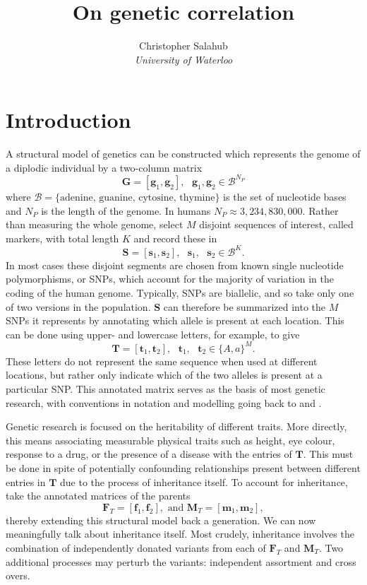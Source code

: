 \documentclass{article}
\title{On genetic correlation}
\author{Christopher Salahub \\
	\textit{University of Waterloo}}
\newcommand{\ve}[1]{\mathbf{#1}}           %
\newcommand{\m}[1]{\mathbf{#1}}               %
\begin{document}
	
\maketitle

\section{Introduction} \label{sec:intro}

A structural model of genetics can be constructed which represents the genome of a diplodic individual by a two-column matrix
$$\m{G} = [\ve{g}_1, \ve{g}_2], \text{ } \ve{g}_1, \ve{g}_2 \in \mathcal{B}^{N_P}$$
where $\mathcal{B} = \{\text{adenine, guanine, cytosine, thymine}\}$ is the set of nucleotide bases and $N_P$ is the length of the genome. In humans $N_P \approx 3,234,830,000$. Rather than measuring the whole genome, select $M$ disjoint sequences of interest, called markers, with total length $K$ and record these in
$$\m{S} = [\ve{s}_1 , \ve{s}_2], \text{ } \ve{s}_1, \text{ } \ve{s}_2 \in \mathcal{B}^K.$$
In most cases these disjoint segments are chosen from known single nucleotide polymorphisms, or SNPs, which account for the majority of variation in the coding of the human genome. Typically, SNPs are biallelic, and so take only one of two versions in the population. $\m{S}$ can therefore be summarized into the $M$ SNPs it represents by annotating which allele is present at each location. This can be done using upper- and lowercase letters, for example, to give
\begin{equation} \label{eq:annotMat}
  \m{T} = [\ve{t}_1 , \ve{t}_2], \text{ } \ve{t}_1, \text{ } \ve{t}_2 \in \{A,a\}^M.
\end{equation}
These letters do not represent the same sequence when used at different locations, but rather only indicate which of the two alleles is present at a particular SNP. This annotated matrix serves as the basis of most genetic research, with conventions in notation and modelling going back to \cite{mendel1866} and \cite{fisher1919}.

Genetic research is focused on the heritability of different traits. More directly, this means associating measurable physical traits such as height, eye colour, response to a drug, or the presence of a disease with the entries of $\m{T}$. This must be done in spite of potentially confounding relationships present between different entries in $\m{T}$ due to the process of inheritance itself. To account for inheritance, take the annotated matrices of the parents
\begin{equation} \label{eq:parentAnnot}
  \m{F}_T = [\ve{f}_1 , \ve{f}_2]
, \text{ and }
\m{M}_T = [\ve{m}_1 , \ve{m}_2],
\end{equation}
thereby extending this structural model back a generation. We can now meaningfully talk about inheritance itself. Most crudely, inheritance involves the combination of independently donated variants from each of $\m{F}_T$ and $\m{M}_T$. Two additional processes may perturb the variants: independent assortment and cross overs.
\end{document}
